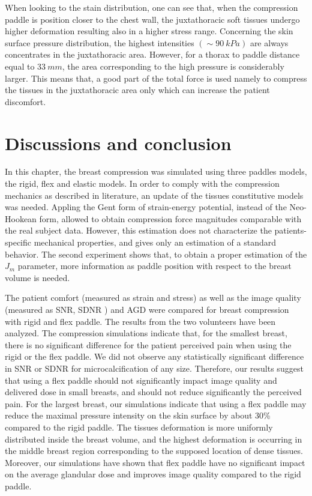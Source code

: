 When looking to the stain distribution, one can see that, when the compression paddle is position closer to the chest wall, the juxtathoracic soft tissues undergo higher deformation resulting also in a higher stress range. Concerning the skin surface pressure distribution, the highest intensities $ (\sim 90\ kPa)$ are always concentrates in the juxtathoracic area. However, for a thorax to paddle distance equal to $33\ mm$, the area corresponding to the high pressure is considerably larger. This means that, a good part of the total force is used namely to compress the tissues in the juxtathoracic area only which can increase the patient discomfort.



\section{Discussions and conclusion}\label{section:compressionfem:conclusion}

In this chapter, the breast compression was simulated using three paddles models, the rigid, flex and elastic models. In order to comply with the compression mechanics as described in literature, an update of the tissues constitutive models was needed. Appling the Gent form of strain-energy potential, instead of the Neo-Hookean form, allowed to obtain compression force magnitudes comparable with the real subject data.  
However, this estimation does not characterize the patients-specific mechanical properties, and gives only an estimation of a standard behavior.  The second experiment shows that, to obtain a proper estimation of the $J_m$ parameter, more information as paddle position with respect to the breast volume is needed. 

The patient comfort (measured as strain and stress) as well as the image quality (measured as SNR, SDNR ) and AGD were compared for breast compression with rigid and flex paddle. The results from the two volunteers have been analyzed. The compression simulations indicate that, for the smallest breast, there is no significant difference for the patient perceived pain when using the rigid or the flex paddle. We did not observe any statistically significant difference in SNR or SDNR for microcalcification of any size. Therefore, our results suggest that using a flex paddle should not significantly impact image quality and delivered dose in small breasts, and should not reduce significantly the perceived pain.   
For the largest breast, our simulations indicate that using a flex paddle may reduce the maximal pressure intensity on the skin surface by about 30\% compared to the rigid paddle. The tissues deformation is more uniformly distributed inside the breast volume, and the highest deformation is occurring in the middle breast region corresponding to the supposed location of dense tissues. Moreover, our simulations have shown that flex paddle have no significant impact on the average glandular dose and improves image quality compared to the rigid paddle. 

